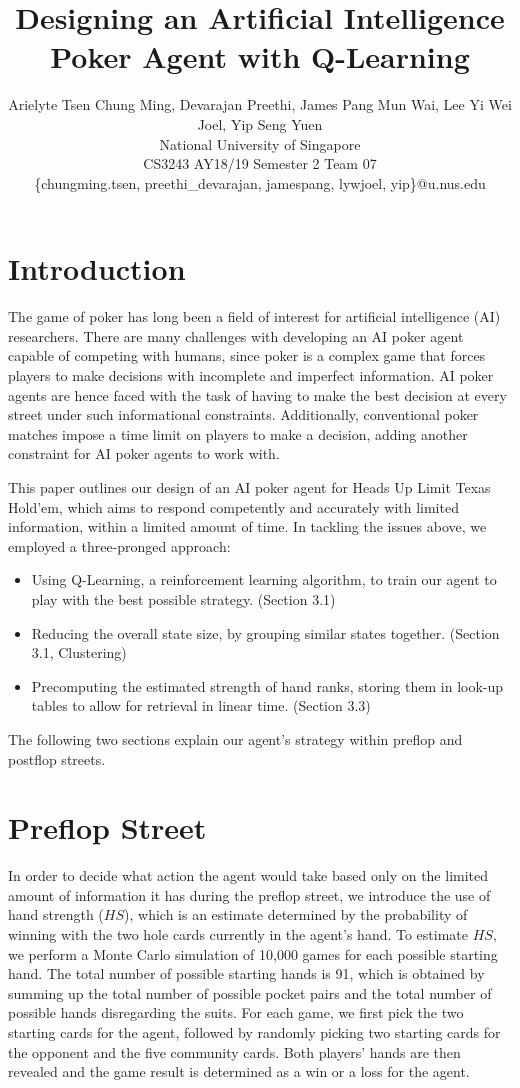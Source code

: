 \documentclass{article}
\title{Designing an Artificial Intelligence Poker Agent with Q-Learning}
\author{
Arielyte Tsen Chung Ming, Devarajan Preethi, James Pang Mun Wai, Lee Yi Wei Joel, Yip Seng Yuen
\\ 
National University of Singapore\\
CS3243 AY18/19 Semester 2 Team 07\\
%
\{chungming.tsen, preethi\_devarajan, jamespang, lywjoel, yip\}@u.nus.edu
}
\begin{document}
\maketitle

\section{Introduction}

The game of poker has long been a field of interest for artificial intelligence (AI) researchers. There are many challenges with developing an AI poker agent capable of competing with humans, since poker is a complex game that forces players to make decisions with incomplete and imperfect information. AI poker agents are hence faced with the task of having to make the best decision at every street under such informational constraints. Additionally, conventional poker matches impose a time limit on players to make a decision, adding another constraint for AI poker agents to work with.

This paper outlines our design of an AI poker agent for Heads Up Limit Texas Hold’em, which aims to respond competently and accurately with limited information, within a limited amount of time. In tackling the issues above, we employed a three-pronged approach:

\begin{itemize}
  \item Using Q-Learning, a reinforcement learning algorithm, to train our agent to play with the best possible strategy. (Section 3.1)
  \item Reducing the overall state size, by grouping similar states together. (Section 3.1, Clustering)
  \item Precomputing the estimated strength of hand ranks, storing them in look-up tables to allow for retrieval in linear time. (Section 3.3)
 \end{itemize}

The following two sections explain our agent’s strategy within preflop and postflop streets.

\section{Preflop Street}

In order to decide what action the agent would take based only on the limited amount of information it has during the preflop street, we introduce the use of hand strength ($HS$), which is an estimate determined by the probability of winning with the two hole cards currently in the agent’s hand.
To estimate $HS$, we perform a Monte Carlo simulation of 10,000 games for each possible starting hand. The total number of possible starting hands is 91, which is obtained by summing up the total number of possible pocket pairs and the total number of possible hands disregarding the suits. For each game, we first pick the two starting cards for the agent, followed by randomly picking two starting cards for the opponent and the five community cards. Both players’ hands are then revealed and the game result is determined as a win or a loss for the agent.
\end{document}
